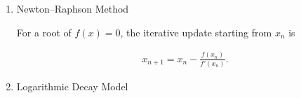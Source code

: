 \begin{enumerate}[label=\thesubsection.\arabic*,ref=\thesubsection.\theenumi]
\begin{align}
R\,i(t)+L\frac{di(t)}{dt}+\frac{1}{C}\int i(t)\,dt=v(t).
\end{align}

In the phasor domain, the impedance is

\begin{align}
Z(\omega)&=R+j\left(\omega L-\frac{1}{\omega C}\right)\\
|Z(\omega)|&=\sqrt{R^{2}+\left(\omega L-\frac{1}{\omega C}\right)^{2}}.
\end{align}

Converting to complex phasor notation 

\begin{align}
V(t) &= V_{\text{rms}} \sqrt{2} e^{j\omega t}\\
I(t) &= I_{\text{rms}} \sqrt{2} e^{j(\omega t - \phi)}
\end{align}
\begin{align}
Z(\omega) &= \frac{V(\omega)}{I(\omega)}\\
&= R + j\omega L + \frac{1}{j\omega C} \\
&= R + j\left(\omega L - \frac{1}{\omega C}\right)
\end{align}

Resonance occurs when the reactive part vanishes:

\begin{align}
\omega_0 L&=\frac{1}{\omega_0 C}\\
\implies \omega_0 &=\frac{1}{\sqrt{LC}}\\
f_0 &=\frac{\omega_0}{2\pi}.
\end{align}

At resonance, $Z(\omega_0)=R$, so

\begin{align}
I_{\text{rms}}(\omega_0)=\frac{V_{\text{rms}}}{R}. \label{res}
\end{align}

\item Newton--Raphson Method

For a root of $f(x)=0$, the iterative update starting from $x_n$ is

\begin{align}
x_{n+1}=x_n-\frac{f(x_n)}{f'(x_n)}. \label{raphson}
\end{align}

\item Logarithmic Decay Model


\end{enumerate}
